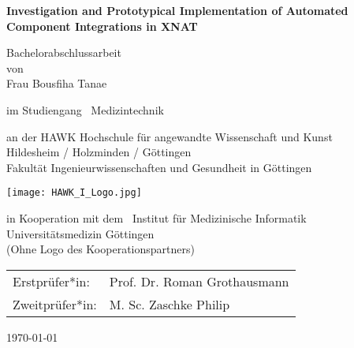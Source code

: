 %
%
\begin{titlepage}
	\begin{center}
		{\Large \textbf{Investigation and Prototypical Implementation of Automated Component Integrations in XNAT}}
		
		\vspace{\fill}
		
		Bachelorabschlussarbeit  \\
		von \\
		Frau Bousfiha Tanae
		
		\vspace{0.9cm}
		
		im Studiengang \ Medizintechnik \\
		
		\vspace{0.9cm}
		
		an der HAWK Hochschule für angewandte Wissenschaft und Kunst\\
		Hildesheim / Holzminden / Göttingen\\
		Fakultät Ingenieurwissenschaften und Gesundheit in Göttingen
		
		\vspace{0.1cm}
		
		\texttt{[image: HAWK\_I\_Logo.jpg]}
		
		\vspace{0.1cm}
		
		in Kooperation mit dem \ Institut für Medizinische Informatik 
    \\Universitätsmedizin Göttingen\\
		(Ohne Logo des Kooperationspartners)
		
		\vspace{2.0cm}
		
		\begin{tabular}{p{3cm}l}
			Erstprüfer*in: & Prof. Dr. Roman Grothausmann \\ 
			Zweitprüfer*in: & M. Sc. Zaschke Philip\\  
		\end{tabular} 
		
		\vspace{1.6cm}
	
		\today
		
	\end{center}
	
	
	
\end{titlepage}









